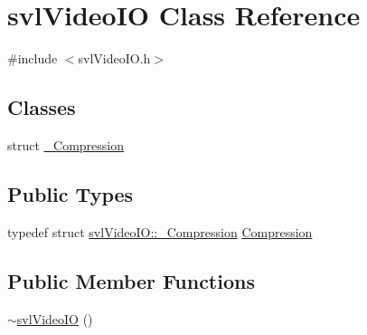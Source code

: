 \hypertarget{classsvl_video_i_o}{}\section{svl\+Video\+I\+O Class Reference}
\label{classsvl_video_i_o}


{\ttfamily \#include $<$svl\+Video\+I\+O.\+h$>$}

\subsection*{Classes}
\begin{DoxyCompactItemize}
\item 
struct \hyperlink{structsvl_video_i_o_1_1___compression}{\+\_\+\+Compression}
\end{DoxyCompactItemize}
\subsection*{Public Types}
\begin{DoxyCompactItemize}
\item 
typedef struct \hyperlink{structsvl_video_i_o_1_1___compression}{svl\+Video\+I\+O\+::\+\_\+\+Compression} \hyperlink{classsvl_video_i_o_a932d071ec9be4fefde824ab9b9125282}{Compression}
\end{DoxyCompactItemize}
\subsection*{Public Member Functions}
\begin{DoxyCompactItemize}
\item 
\hyperlink{classsvl_video_i_o_af736c01b3a1a65156b0669850be83979}{$\sim$svl\+Video\+I\+O} ()
\end{DoxyCompactItemize}

